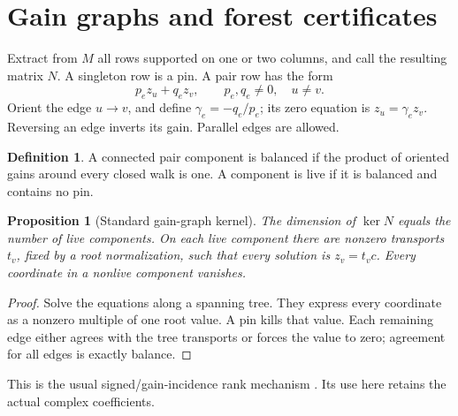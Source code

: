 \documentclass[11pt,a4paper,oneside]{report}
\newtheorem{proposition}[theorem]{Proposition}
\theoremstyle{definition}
\newtheorem{definition}[theorem]{Definition}
\theoremstyle{remark}
\begin{document}
\section{Gain graphs and forest certificates}\label{M02:sec:forest}
Extract from \(M\) all rows supported on one or two columns, and call the resulting matrix \(N\). A singleton row is a pin. A pair row has the form
\[
p_e z_u+q_e z_v,\qquad p_e,q_e\ne0,\quad u\ne v.
\]
Orient the edge \(u\to v\), and define \(\gamma_e=-q_e/p_e\); its zero equation is \(z_u=\gamma_ez_v\). Reversing an edge inverts its gain. Parallel edges are allowed.
\begin{definition}
A connected pair component is balanced if the product of oriented gains around every closed walk is one. A component is live if it is balanced and contains no pin.
\end{definition}
\begin{proposition}[Standard gain-graph kernel]\label{M02:prop:gain}
The dimension of \(\ker N\) equals the number of live components. On each live component there are nonzero transports \(t_v\), fixed by a root normalization, such that every solution is \(z_v=t_vc\). Every coordinate in a nonlive component vanishes.
\end{proposition}
\begin{proof}
Solve the equations along a spanning tree. They express every coordinate as a nonzero multiple of one root value. A pin kills that value. Each remaining edge either agrees with the tree transports or forces the value to zero; agreement for all edges is exactly balance.
\end{proof}
This is the usual signed/gain-incidence rank mechanism \cite{B:Zaslavsky,B:Reff}. Its use here retains the actual complex coefficients.
\end{document}
